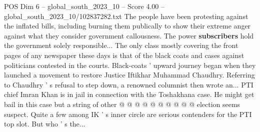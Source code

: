 \begin{textsample}{POS Dim 6 – global\_south\_2023\_10 – Score 4.00 – global\_south\_2023\_10/102837282.txt}
The people have been protesting against the inflated bills, including burning them publically to show their extreme anger against what they consider government callousness.
The power \textbf{subscribers} hold the government solely responsible...
The only class mostly covering the front pages of any newspaper these days is that of the black coats and cases against politicians contested in the courts.
Black-coats ' upward journey began when they launched a movement to restore Justice Iftikhar Muhammad Chaudhry.
Referring to Chaudhry ' s refusal to step down, a renowned columnist then wrote an...
PTI chief Imran Khan is in jail in connection with the Toshakhana case.
He might get bail in this case but a string of other @ @ @ @ @ @ @ @ @ @ election seems suspect.
Quite a few among IK ' s inner circle are serious contenders for the PTI top slot.
But who ' s the...

\end{textsample}
